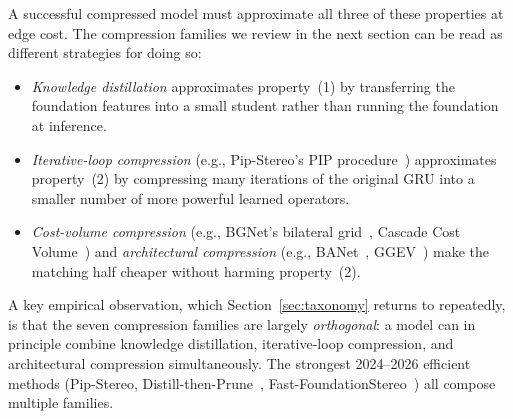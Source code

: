 A successful compressed model must approximate all three of these properties at edge cost. The compression families we review in the next section can be read as different strategies for doing so:
\begin{itemize}
\item \emph{Knowledge distillation} approximates property~(1) by transferring the foundation features into a small student rather than running the foundation at inference.
\item \emph{Iterative-loop compression} (e.g., Pip-Stereo's PIP procedure~\cite{zheng2026pipstereo}) approximates property~(2) by compressing many iterations of the original GRU into a smaller number of more powerful learned operators.
\item \emph{Cost-volume compression} (e.g., BGNet's bilateral grid~\cite{xu2021bgnet}, Cascade Cost Volume~\cite{gu2020cascade}) and \emph{architectural compression} (e.g., BANet~\cite{xu2025banet}, GGEV~\cite{liu2026ggev}) make the matching half cheaper without harming property~(2).
\end{itemize}

A key empirical observation, which Section~\ref{sec:taxonomy} returns to repeatedly, is that the seven compression families are largely \emph{orthogonal}: a model can in principle combine knowledge distillation, iterative-loop compression, and architectural compression simultaneously. The strongest 2024--2026 efficient methods (Pip-Stereo, Distill-then-Prune~\cite{pan2024dtp}, Fast-FoundationStereo~\cite{wen2026fastfoundationstereo}) all compose multiple families.
